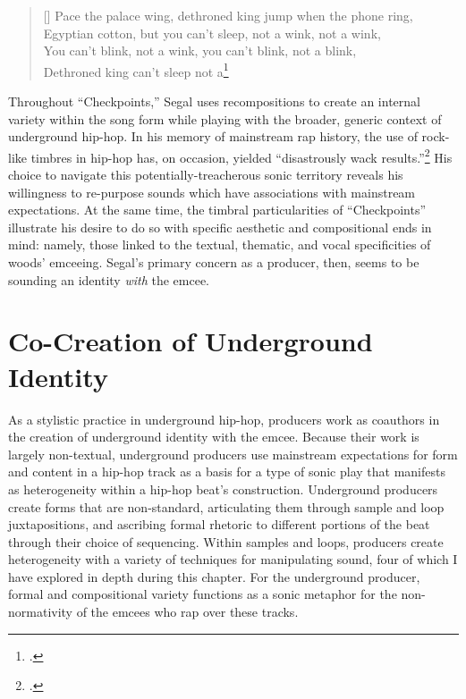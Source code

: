 \settowidth{\versewidth}{Pace the palace wing, dethroned king jump when the phone ring,}
\begin{verse}[\versewidth]
    Pace the palace wing, dethroned king jump when the phone ring, \\
    Egyptian cotton, but you can't sleep, not a wink, not a wink, \\
    You can't blink, not a wink, you can't blink, not a blink, \\
    Dethroned king can't sleep not a\textellipsis\footnote{
    \cite{billywoods2019}.}
\end{verse}

\normalsize
Throughout ``Checkpoints,'' Segal uses  recompositions to create an internal variety within the song
form while playing with the broader, generic context of underground hip-hop. In his memory of 
mainstream rap history, the use of rock-like timbres in hip-hop has,  on occasion, yielded ``disastrously
wack results.''\footnote{
    \cite{backwoodzhiphopKennySegalPresents2019}.}
His choice to navigate this potentially-treacherous sonic territory reveals his willingness to re-purpose
sounds which have associations with mainstream expectations. At the same time, the timbral particularities
of ``Checkpoints'' illustrate his desire to do so with specific aesthetic
and compositional ends in mind: namely, those linked to the textual, thematic, and vocal specificities
of woods' emceeing. Segal's primary concern as a  producer, then, seems to be sounding an identity
\emph{with} the emcee.

\section{Co-Creation of Underground Identity}
As a stylistic practice in underground hip-hop, producers work as coauthors in the creation of underground
identity with the emcee. Because their work is largely non-textual, underground producers use mainstream 
expectations for form and content in a hip-hop track as a basis for a type of sonic play that manifests
as heterogeneity within a hip-hop beat's construction. Underground producers create forms that are 
non-standard, articulating them through sample and loop juxtapositions, and ascribing formal rhetoric 
to different portions of the beat through their choice of sequencing. Within samples and loops, producers
create heterogeneity with a variety of techniques for manipulating  sound, four of which I have explored
in depth during this chapter. For the underground producer, formal and compositional variety functions
as a sonic metaphor for the non-normativity of the emcees who rap over these tracks.